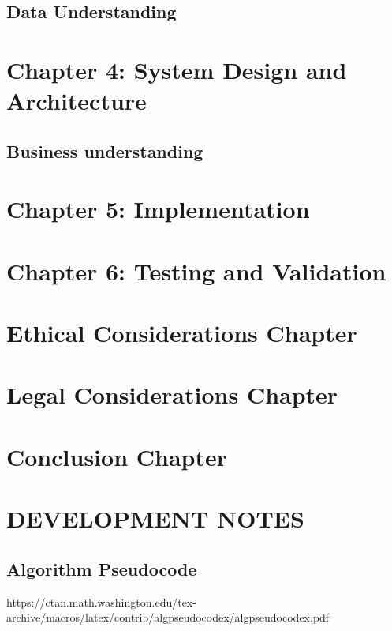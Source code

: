 \documentclass[preprint,12pt,review,authoryear]{elsarticle}
\begin{document}
\subsection{Data Understanding}

\section{Chapter 4: System Design and Architecture}

\subsection{Business understanding}



\section{Chapter 5: Implementation}



\section{Chapter 6: Testing and Validation}

\section{Ethical Considerations Chapter}

\section{Legal Considerations Chapter}

\section{Conclusion Chapter}




\section{DEVELOPMENT NOTES}

\subsection{Algorithm Pseudocode}
https://ctan.math.washington.edu/tex-archive/macros/latex/contrib/algpseudocodex/algpseudocodex.pdf
\end{document}

